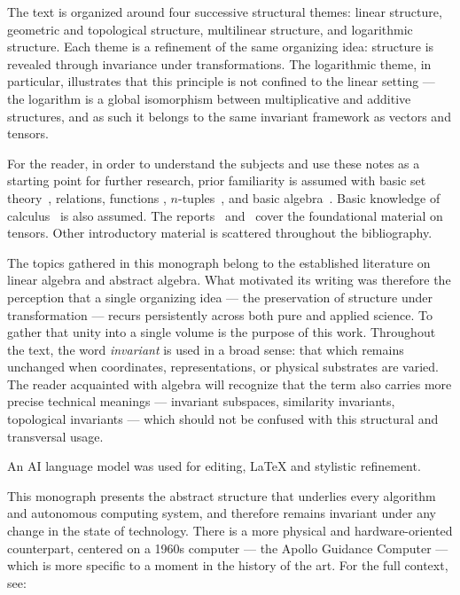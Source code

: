 \documentclass[12pt,openany]{book}
\theoremstyle{definition}
\begin{document}
\medskip

The text is organized around four successive structural themes: linear
structure, geometric and topological structure, multilinear structure, and
logarithmic structure.
Each theme is a refinement of the same organizing idea: structure is revealed
through invariance under transformations.
The logarithmic theme, in particular, illustrates that this principle is not
confined to the linear setting --- the logarithm is a global isomorphism
between multiplicative and additive structures, and as such it belongs to the
same invariant framework as vectors and tensors.

\medskip

For the reader, in order to understand the subjects and use these notes as a
starting point for further research, prior familiarity is assumed with basic
set theory~\cite{wilder}\cite{cohen}\cite{apostol}, relations, functions
\cite{apostol}, $n$-tuples~\cite{iribarren}\cite{cohen}, and basic
algebra~\cite{iribarren}.
Basic knowledge of calculus~\cite{apostol} is also assumed.
The reports~\cite{kolecki} and~\cite{kolecki2} cover the foundational material
on tensors.
Other introductory material is scattered throughout the bibliography.

\medskip

The topics gathered in this monograph belong to the established literature on
linear algebra and abstract algebra.
What motivated its writing was therefore the perception that a single organizing idea ---
the preservation of structure under transformation --- recurs persistently
across both pure and applied science.
To gather that unity into a single volume is the purpose of this work.
Throughout the text, the word \textit{invariant} is used in a broad sense:
that which remains unchanged when coordinates, representations, or physical
substrates are varied.
The reader acquainted with algebra will recognize that the term also carries
more precise technical meanings --- invariant subspaces, similarity invariants,
topological invariants --- which should not be confused with this structural
and transversal usage.

\medskip

An AI language model was used for editing, \LaTeX{} and stylistic refinement.

\medskip

This monograph presents the abstract structure that underlies every algorithm
and autonomous computing system, and therefore remains invariant under any
change in the state of technology.
There is a more physical and hardware-oriented counterpart, centered on a
1960s computer --- the Apollo Guidance Computer --- which is more specific to a
moment in the history of the art.
For the full context, see:
\end{document}
